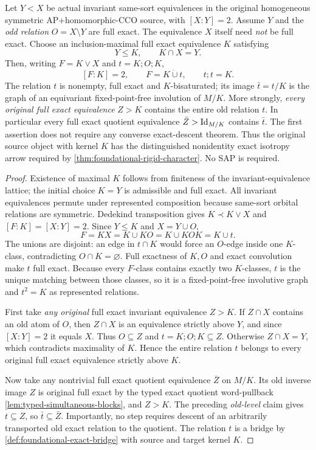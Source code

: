 \begin{theorem}
\label{thm:foundational-maximal-parity-gate}
Let $Y<X$ be actual invariant same-sort equivalences in the
original homogeneous symmetric AP+homomorphic-CCO source,
with $[X:Y]=2$. Assume $Y$ and the \emph{odd relation}
$O=X\setminus Y$ are full exact. The equivalence $X$
itself need \emph{not} be full exact. Choose an
inclusion-maximal full exact equivalence $K$ satisfying
\[
             Y\le K,\qquad K\cap X=Y.
\]
Then, writing $F=K\vee X$ and $t=K;O;K$,
\[
             [F:K]=2,\qquad
             F=K\mathbin{\dot\cup}t,\qquad
             t;t=K.
\]
The relation $t$ is nonempty, full exact and $K$-bisaturated;
its image $\bar t=t/K$ is the graph of an equivariant
fixed-point-free involution of $M/K$.
More strongly, \emph{every original full exact
equivalence} $Z>K$ contains the entire
old relation $t$. In particular every full
exact quotient equivalence
$\bar Z>\mathrm{Id}_{M/K}$ contains $\bar t$.
The first assertion does not require any
converse exact-descent theorem.
Thus the original source object with kernel $K$ has the
distinguished nonidentity exact isotropy arrow required by
\cref{thm:foundational-rigid-character}.
No SAP is required.
\end{theorem}
\begin{proof}
Existence of maximal $K$ follows from finiteness
of the invariant-equivalence lattice; the initial
choice $K=Y$ is admissible and full exact.
All invariant equivalences permute under represented
composition because same-sort orbital relations
are symmetric. Dedekind transposition gives
$K\prec K\vee X$ and $[F:K]=[X:Y]=2$.
Since $Y\le K$ and $X=Y\cup O$,
\[
 F=KX=K\cup KO=K\cup KOK=K\cup t.
\]
The unions are disjoint: an edge in $t\cap K$
would force an $O$-edge inside one $K$-class,
contradicting $O\cap K=\varnothing$.
Full exactness of $K,O$ and exact convolution
make $t$ full exact. Because every $F$-class
contains exactly two $K$-classes, $t$ is
the unique matching between those classes,
so it is a fixed-point-free involutive graph
and $t^2=K$ as represented relations.

First take \emph{any original} full exact
invariant equivalence $Z>K$. If
$Z\cap X$ contains an old atom of $O$,
then $Z\cap X$ is an equivalence strictly
above $Y$, and since $[X:Y]=2$ it equals
$X$. Thus $O\subseteq Z$ and
$t=K;O;K\subseteq Z$. Otherwise
$Z\cap X=Y$, which contradicts
maximality of $K$. Hence the entire
relation $t$ belongs to every original
full exact equivalence strictly above $K$.

Now take any nontrivial full exact quotient
equivalence $\bar Z$ on $M/K$. Its old
inverse image $Z$ is original full exact
by the typed exact quotient word-pullback
\cref{lem:typed-simultaneous-blocks}, and
$Z>K$. The preceding \emph{old-level}
claim gives $t\subseteq Z$, so
$\bar t\subseteq\bar Z$. Importantly,
no step requires descent of an arbitrarily
transported old exact relation to the
quotient. The relation $t$ is a bridge by
\cref{def:foundational-exact-bridge} with
source and target kernel $K$.
\end{proof}

